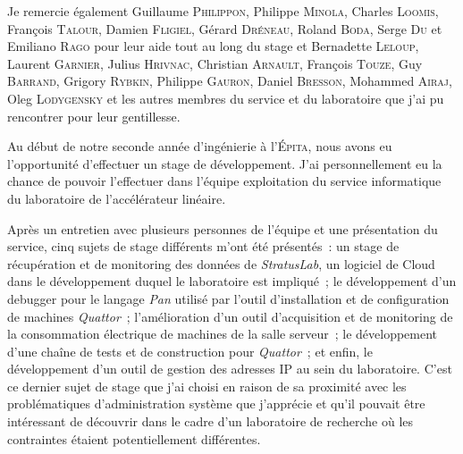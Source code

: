 \documentclass[12pt,a4paper,twoside]{report}
\makeatletter
\renewcommand\chapter{\clearpage\@startsection{chapter}{1}{-0.75em}{\baselineskip}{0.5\baselineskip}{\LARGE\textbf}}
\makeatother
\begin{document}
Je remercie également Guillaume \textsc{Philippon}, Philippe
\textsc{Minola}, Charles \textsc{Loomis}, François \textsc{Talour}, Damien
\textsc{Fligiel}, Gérard \textsc{Dréneau}, Roland \textsc{Boda}, Serge
\textsc{Du} et Emiliano \textsc{Rago} pour leur aide tout au long du stage et
Bernadette \textsc{Leloup}, Laurent \textsc{Garnier}, Julius
\textsc{Hrivnac}, Christian \textsc{Arnault}, François \textsc{Touze}, Guy
\textsc{Barrand}, Grigory \textsc{Rybkin}, Philippe \textsc{Gauron}, Daniel
\textsc{Bresson}, Mohammed \textsc{Airaj}, Oleg \textsc{Lodygensky} et les
autres membres du service et du laboratoire que j’ai pu rencontrer pour leur
gentillesse.


\newpage
\thispagestyle{empty}

\tableofcontents

\newpage

\setcounter{page}{1}

\chapter{Introduction}

Au début de notre seconde année d’ingénierie à l’\textsc{Épita}, nous avons eu
l’opportunité d’effectuer un stage de développement. J’ai personnellement eu la
chance de pouvoir l’effectuer dans l’équipe exploitation du service
informatique du laboratoire de l’accélérateur linéaire.

Après un entretien avec plusieurs personnes de l’équipe et une présentation du
service, cinq sujets de stage différents m’ont été présentés~: un stage de
récupération et de monitoring des données de \emph{StratusLab}, un logiciel de
Cloud dans le développement duquel le laboratoire est impliqué~; le
développement d’un debugger pour le langage \emph{Pan} utilisé par l’outil
d’installation et de configuration de machines \emph{Quattor}~; l’amélioration
d’un outil d’acquisition et de monitoring de la consommation électrique de
machines de la salle serveur~; le développement d’une chaîne de tests et de
construction pour \emph{Quattor}~; et enfin, le développement d’un outil de
gestion des adresses IP au sein du laboratoire. C’est ce dernier sujet de stage
que j’ai choisi en raison de sa proximité avec les problématiques
d’administration système que j’apprécie et qu’il pouvait être intéressant de
découvrir dans le cadre d’un laboratoire de recherche où les contraintes
étaient potentiellement différentes.\\
\end{document}
